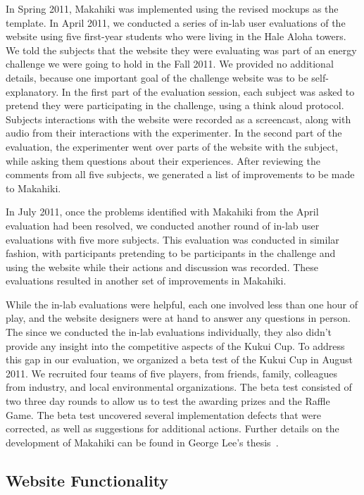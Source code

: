 In Spring 2011, Makahiki was implemented using the revised mockups as the template. In April 2011, we conducted a series of in-lab user evaluations of the website using five first-year students who were living in the Hale Aloha towers. We told the subjects that the website they were evaluating was part of an energy challenge we were going to hold in the Fall 2011. We provided no additional details, because one important goal of the challenge website was to be self-explanatory. In the first part of the evaluation session, each subject was asked to pretend they were participating in the challenge, using a think aloud protocol. Subjects interactions with the website were recorded as a screencast, along with audio from their interactions with the experimenter. In the second part of the evaluation, the experimenter went over parts of the website with the subject, while asking them questions about their experiences. After reviewing the comments from all five subjects, we generated a list of improvements to be made to Makahiki.

In July 2011, once the problems identified with Makahiki from the April evaluation had been resolved, we conducted another round of in-lab user evaluations with five more subjects. This evaluation was conducted in similar fashion, with participants pretending to be participants in the challenge and using the website while their actions and discussion was recorded. These evaluations resulted in another set of improvements in Makahiki.

While the in-lab evaluations were helpful, each one involved less than one hour of play, and the website designers were at hand to answer any questions in person. The since we conducted the in-lab evaluations individually, they also didn't provide any insight into the competitive aspects of the Kukui Cup. To address this gap in our evaluation, we organized a beta test of the Kukui Cup in August 2011. We recruited four teams of five players, from friends, family, colleagues from industry, and local environmental organizations. The beta test consisted of two three day rounds to allow us to test the awarding prizes and the Raffle Game. The beta test uncovered several implementation defects that were corrected, as well as suggestions for additional actions. Further details on the development of Makahiki can be found in George Lee's thesis~\cite{csdl2-11-01}.


\subsection{Website Functionality}

